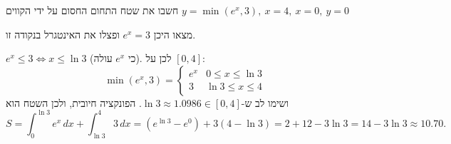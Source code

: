 
\begin{question}
חשבו את שטח התחום החסום על ידי הקווים $y=\min\left(e^x,3\right),\ x=4,\ x=0,\ y=0$
\end{question}

\begin{hint}
מצאו היכן $e^x=3$ ופצלו את האינטגרל בנקודה זו.
\end{hint}

\begin{solution}
$e^x\le 3\iff x\le\ln3$ (כי $e^x$ עולה). לכן על $[0,4]$:
\[ \min(e^x,3)=\begin{cases} e^x & 0\le x\le\ln 3\\ 3 & \ln3\le x\le 4\end{cases} \]
ושימו לב ש-$\ln3\approx1.0986\in[0,4]$. הפונקציה חיובית, ולכן השטח הוא
\[ S=\int_0^{\ln3}e^x\,dx+\int_{\ln3}^{4}3\,dx=\left(e^{\ln3}-e^0\right)+3(4-\ln3)=2+12-3\ln3=\boxed{14-3\ln3}\approx 10.70. \]
\end{solution}
